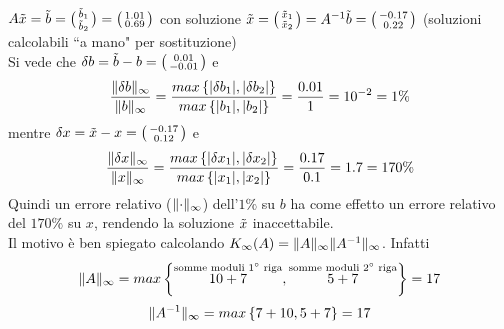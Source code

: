 \documentclass[12pt,a4paper]{article}
\DeclarePairedDelimiter{\norma}{\lVert}{\rVert}
\begin{document}
 $A\tilde{x}=\tilde{b}=\bigl(\begin{smallmatrix}
    \Tilde{b}_1 \\
    \Tilde{b}_2
\end{smallmatrix}\bigr)=\bigl(\begin{smallmatrix}
    1.01 \\
    0.69
\end{smallmatrix}\bigr)$ con soluzione $\Tilde{x}=\bigl(\begin{smallmatrix}
    \Tilde{x}_1 \\
    \Tilde{x}_2
\end{smallmatrix}\bigr) =A^{-1}\Tilde{b}=\bigl(\begin{smallmatrix}
    -0.17 \\
    0.22
\end{smallmatrix}\bigr)$ (soluzioni calcolabili ``a mano" per sostituzione)\\
Si vede che $\delta b=\Tilde{b}-b = \bigl(\begin{smallmatrix}
    0.01 \\
    -0.01
\end{smallmatrix}\bigr)$ e 
\begin{equation*}
    \frac{\norma{\delta b}_\infty}{\norma{b}_\infty} = \frac{max\left\{ |\delta b_1|,|\delta b_2| \right\}}{max\left\{ |b_1|,|b_2| \right\}} = \frac{0.01}{1} = 10^{-2} = 1\%
\end{equation*} mentre $\delta x = \Tilde{x}-x=\bigl(\begin{smallmatrix}
    -0.17 \\
    0.12
\end{smallmatrix}\bigr)$ e 
\begin{equation*}
    \frac{\norma{\delta x}_\infty}{\norma{x}_\infty} = \frac{max\left\{ |\delta x_1|,|\delta x_2| \right\}}{max\left\{ |x_1|,|x_2| \right\}} = \frac{0.17}{0.1} = 1.7 = 170\%
\end{equation*}
Quindi un errore relativo ($\norma{\cdot}_\infty$) dell'$1\%$ su $b$ ha come effetto un errore relativo del $170\%$ su $x$, rendendo la soluzione $\Tilde{x}$ inaccettabile. \\
Il motivo è ben spiegato calcolando $K_\infty(A)=\norma{A}_\infty \norma{A^{-1}}_\infty$. Infatti
\begin{equation*}
    \norma{A}_\infty = max \left\{ \overset{\text{somme moduli 1$^\circ$ riga}}{10+7}, \overset{\text{somme moduli 2$^\circ$ riga}}{5+7} \right\} = 17
\end{equation*}
\begin{equation*}
    \norma{A^{-1}}_\infty = max \left\{ 7+10, 5+7 \right\} = 17
\end{equation*}
\end{document}
